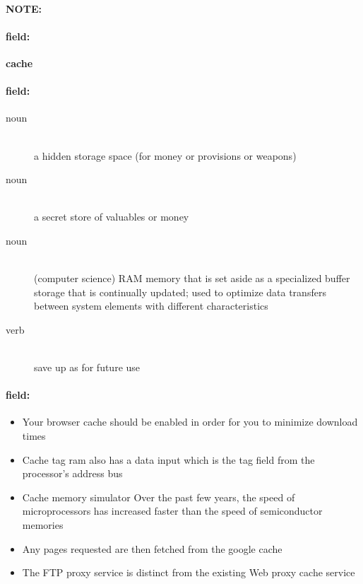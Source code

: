 \documentclass[12pt]{article}
\newenvironment{note}{\paragraph{NOTE:}}{}
\newenvironment{field}{\paragraph{field:}}{}
\begin{document}
\begin{note}
\begin{field}
\textbf{\large cache}
\end{field}


\begin{field}
\begin{description}
\item[noun] \hfill \\ 
a hidden storage space (for money or provisions or weapons)

\item[noun] \hfill \\ 
a secret store of valuables or money

\item[noun] \hfill \\ 
(computer science) RAM memory that is set aside as a specialized buffer storage that is continually updated; used to optimize data transfers between system elements with different characteristics

\item[verb] \hfill \\ 
save up as for future use

\end{description}
\end{field}

\begin{field}
\begin{itemize}
\item Your browser cache should be enabled in order for you to minimize download times
\item Cache tag ram also has a data input which is the tag field from the processor's address bus
\item Cache memory simulator Over the past few years, the speed of microprocessors has increased faster than the speed of semiconductor memories
\item Any pages requested are then fetched from the google cache
\item The FTP proxy service is distinct from the existing Web proxy cache service
\end{itemize}
\end{field}
\end{note}
\end{document}

